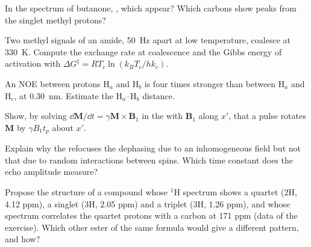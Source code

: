 \begin{exercise}[$\star\star$]\label{exo:b3:advanced-nmr:7}
In the  spectrum of butanone, , which  appear?
Which carbons show  peaks from the singlet methyl protons?
\end{exercise}

\begin{exercise}[$\star\star$]\label{exo:b3:advanced-nmr:8}
Two methyl signals of an amide, \qty{50}{Hz} apart at low temperature, coalesce at
\qty{330}{K}. Compute the exchange rate at coalescence and the Gibbs energy of
activation with $\Delta G^\ddagger = RT_c\ln(k_BT_c/hk_c)$.
\end{exercise}

\begin{exercise}[$\star\star$]\label{exo:b3:advanced-nmr:9}
An NOE between protons H$_a$ and H$_b$ is four times stronger than between H$_a$ and
H$_c$, at \qty{0.30}{nm}. Estimate the H$_a$--H$_b$ distance.
\end{exercise}

\begin{exercise}[$\star\star\star$]\label{exo:b3:advanced-nmr:10}
Show, by solving $\dd\mathbf M/\dd t = \gamma\mathbf M\times\mathbf B_1$ in the 
with $\mathbf B_1$ along $x'$, that a pulse rotates $\mathbf M$ by $\gamma B_1t_p$ about $x'$.
\end{exercise}

\begin{exercise}[$\star\star\star$]\label{exo:b3:advanced-nmr:11}
Explain why the  refocuses the dephasing due to an inhomogeneous
field but not that due to random interactions between spins. Which time
constant does the echo amplitude measure?
\end{exercise}

\begin{exercise}[$\star\star\star$]\label{exo:b3:advanced-nmr:12}
Propose the structure of a compound  whose ${}^1$H spectrum shows a
quartet (2H, 4.12 ppm), a singlet (3H, 2.05 ppm) and a triplet (3H,
1.26 ppm), and whose  spectrum correlates the quartet protons with a
carbon at 171 ppm (data of the exercise). Which other ester of the same
formula would give a different  pattern, and how?
\end{exercise}


